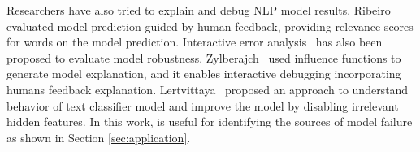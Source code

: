 %
Researchers have also tried to explain and debug NLP model results. Ribeiro
 \textit{\etal}~\cite{ribeiroSG16lime} evaluated model prediction guided by human feedback, providing relevance scores for words on the model prediction. 
 Interactive error analysis~\cite{wu2019errudite} has also been proposed to evaluate
model robustness. Zylberajch~\cite{zylberajch2021hildif} used influence functions to generate model explanation, and it enables interactive debugging incorporating humans feedback
explanation.
Lertvittaya~\cite{lertvittayakumjorn2020find} proposed
an approach to understand behavior of text classifier model and improve the
model by disabling irrelevant hidden features. In this work, \tool
is useful for identifying the sources of model failure as shown in Section \ref{sec:application}. 









